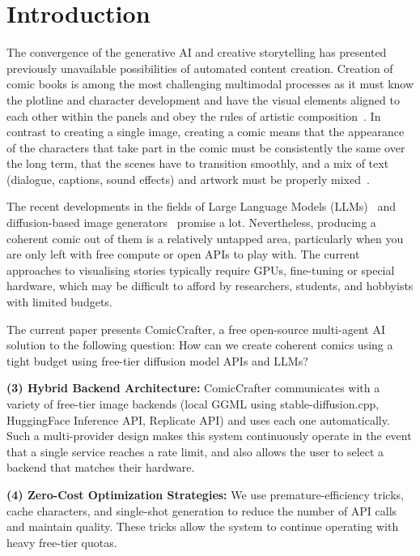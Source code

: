 \documentclass[runningheads]{llncs}
\begin{document}
\section{Introduction}

The convergence of the generative AI and creative storytelling has presented previously unavailable possibilities of automated content creation. Creation of comic books is among the most challenging multimodal processes as it must know the plotline and character development and have the visual elements aligned to each other within the panels and obey the rules of artistic composition~\cite{zhou2024storydiffusion}. In contrast to creating a single image, creating a comic means that the appearance of the characters that take part in the comic must be consistently the same over the long term, that the scenes have to transition smoothly, and a mix of text (dialogue, captions, sound effects) and artwork must be properly mixed~\cite{he2024dreamstory}.

The recent developments in the fields of Large Language Models (LLMs)~\cite{guo2024llm, tran2025multiagent} and diffusion-based image generators~\cite{avrahami2024chosen, wang2025characterfactory} promise a lot. Nevertheless, producing a coherent comic out of them is a relatively untapped area, particularly when you are only left with free compute or open APIs to play with. The current approaches to visualising stories typically require GPUs, fine-tuning or special hardware, which may be difficult to afford by researchers, students, and hobbyists with limited budgets.

The current paper presents ComicCrafter, a free open-source multi-agent AI solution to the following question: How can we create coherent comics using a tight budget using free-tier diffusion model APIs and LLMs?

\textbf{(3) Hybrid Backend Architecture:} ComicCrafter communicates with a variety of free-tier image backends (local GGML using stable-diffusion.cpp, HuggingFace Inference API, Replicate API) and uses each one automatically. Such a multi-provider design makes this system continuously operate in the event that a single service reaches a rate limit, and also allows the user to select a backend that matches their hardware.

\textbf{(4) Zero-Cost Optimization Strategies:} We use premature-efficiency tricks, cache characters, and single-shot generation to reduce the number of API calls and maintain quality. These tricks allow the system to continue operating with heavy free-tier quotas.
\end{document}
